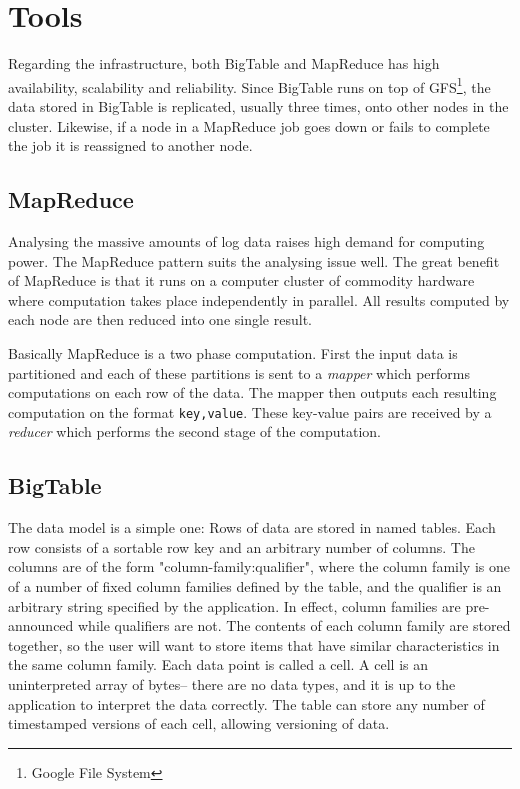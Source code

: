 \documentclass[a4paper,10pt]{book}
\begin{document}
\chapter{Tools}

Regarding the infrastructure, both BigTable and MapReduce has high
availability, scalability and reliability. Since BigTable runs on top of
GFS\footnote{Google File System}, the data stored in BigTable is
replicated, usually three times, onto other nodes in the cluster.
\cite{gfs} Likewise, if a node in a MapReduce job goes down or fails to
complete the job it is reassigned to another node. \cite{mapreduce}


\section{MapReduce}

Analysing the massive amounts of log data raises high demand for computing
power. The MapReduce \cite{mapreduce} pattern suits the analysing issue
well. The great benefit of MapReduce is that it runs on a computer cluster
of commodity hardware where computation takes place independently in
parallel. All results computed by each node are then reduced into one
single result.

Basically MapReduce is a two phase computation. First the input data is
partitioned and each of these partitions is sent to a \textit{mapper} which
performs computations on each row of the data. The mapper then outputs each
resulting computation on the format \texttt{key,value}. These key-value
pairs are received by a \textit{reducer} which performs the second stage of
the computation.


\section{BigTable}

The data model is a simple one: Rows of data are stored in named tables.
Each row consists of a sortable row key and an arbitrary number of columns.
The columns are of the form "column-family:qualifier", where the column
family is one of a number of fixed column families defined by the table,
and the qualifier is an arbitrary string specified by the application. In
effect, column families are pre-announced while qualifiers are not. The
contents of each column family are stored together, so the user will want
to store items that have similar characteristics in the same column family.
Each data point is called a cell. A cell is an uninterpreted array of
bytes-- there are no data types, and it is up to the application to
interpret the data correctly. The table can store any number of timestamped
versions of each cell, allowing versioning of data.
\end{document}

